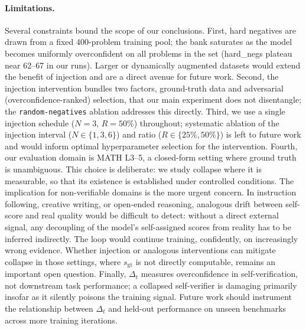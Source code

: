 \documentclass{article}
\newcommand{\gt}{s_{\text{gt}}}         %
\begin{document}
\paragraph{Limitations.}
Several constraints bound the scope of our conclusions.
First, hard negatives are drawn from a fixed 400-problem training pool;
the bank saturates as the model becomes uniformly overconfident on all
problems in the set (hard\_negs plateau near 62--67 in our runs).
Larger or dynamically augmented datasets would extend the benefit of injection
and are a direct avenue for future work.
Second, the injection intervention bundles two factors, ground-truth data
and adversarial (overconfidence-ranked) selection, that our main experiment
does not disentangle; the \texttt{random-negatives} ablation addresses this directly.
Third, we use a single injection schedule ($N{=}3$, $R{=}50\%$) throughout;
systematic ablation of the injection interval ($N \in \{1,3,6\}$) and ratio
($R \in \{25\%, 50\%\}$) is left to future work and would inform optimal
hyperparameter selection for the intervention.
Fourth, our evaluation domain is MATH L3--5, a closed-form setting where
ground truth is unambiguous.
This choice is deliberate: we study collapse where it is measurable, so that
its existence is established under controlled conditions.
The implication for non-verifiable domains is the more urgent concern.
In instruction following, creative writing, or open-ended reasoning, analogous
drift between self-score and real quality would be difficult to detect: without
a direct external signal, any decoupling of the model's self-assigned scores
from reality has to be inferred indirectly.
The loop would continue training, confidently, on increasingly wrong evidence.
Whether injection or analogous interventions can mitigate collapse in those
settings, where $\gt$ is not directly computable, remains an important open
question.
Finally, $\Delta_t$ measures overconfidence in self-verification, not
downstream task performance; a collapsed self-verifier is damaging primarily
insofar as it silently poisons the training signal.
Future work should instrument the relationship between $\Delta_t$ and
held-out performance on unseen benchmarks across more training iterations.
\end{document}
